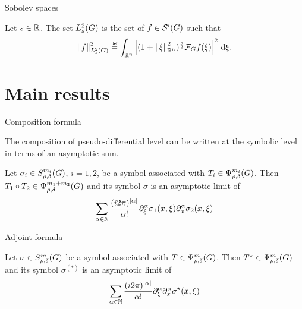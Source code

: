 \documentclass{beamer}
\begin{document}
\begin{frame}
    {Sobolev spaces}

    \begin{definition}
        Let $s \in \mathbb{R}$.
        The set $L^2_{s}(G)$ is the set of $f \in {\mathcal{S}' (G)}$ such that
        \begin{align*}
            \norm [\Sobolev s] f^2
            \defeq \int_{\R^n} \abs{(1 + \norm [\R^n] \xi^2)^\frac s 2 \Fourier f(\xi)}^2 \dd \xi.
        \end{align*}
    \end{definition}
\end{frame}

\section{Main results}

\begin{frame}
    {Composition formula}

    The composition of pseudo-differential level can be written at the symbolic level in terms of an asymptotic sum.

    \begin{theorem}

        Let $\sigma_i \in S^{m_i}_{\rho, \delta}(G)$, $i = 1, 2$,
        be a symbol associated with $T_i \in \Psi^{m_i}_{\rho, \delta}(G)$.
        Then $T_1 \circ T_2 \in \Psi^{m_1 + m_2}_{\rho, \delta}(G)$ and its symbol $\sigma$ is an asymptotic limit of
        \begin{align*}
            \sum_{\alpha \in \N} \frac {(\i \turn)^{\abs \alpha}} {\alpha!}
            \iD {\xi^\alpha} \sigma_1(x, \xi)
            \iD {x^\alpha} \sigma_2(x, \xi)
        \end{align*}
    \end{theorem}
\end{frame}

\begin{frame}
    {Adjoint formula}

    \begin{theorem}

        Let $\sigma \in S^{m}_{\rho, \delta}(G)$
        be a symbol associated with $T \in \Psi^{m}_{\rho, \delta}(G)$.
        Then ${T}^\star \in \Psi^{m}_{\rho, \delta}(G)$ and its symbol $\sigma^{(*)}$ is an asymptotic limit of
        \begin{align*}
            \sum_{\alpha \in \N} \frac {(\i \turn)^{\abs \alpha}} {\alpha!}
            \iD {\xi^\alpha} \iD {x^\alpha} \adj \sigma(x, \xi)
        \end{align*}
    \end{theorem}
\end{frame}
\end{document}
